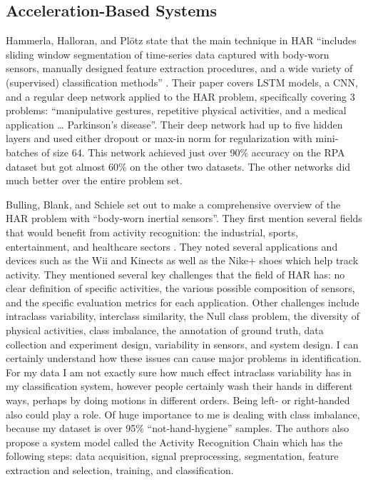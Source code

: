\documentclass[]{report}
\begin{document}
\subsection{Acceleration-Based Systems}

Hammerla, Halloran, and Plötz state that the main technique in HAR “includes sliding window segmentation of time-series data captured with body-worn sensors, manually designed feature extraction procedures, and a wide variety of (supervised) classification methods” \cite{Hammerla}. Their paper covers LSTM models, a CNN, and a regular deep network applied to the HAR problem, specifically covering 3 problems: “manipulative gestures, repetitive physical activities, and a medical application … Parkinson’s disease”. Their deep network had up to five hidden layers and used either dropout or max-in norm for regularization with mini-batches of size 64. This network achieved just over 90\% accuracy on the RPA dataset but got almost 60\% on the other two datasets. The other networks did much better over the entire problem set.

Bulling, Blank, and Schiele set out to make a comprehensive overview of the HAR problem with “body-worn inertial sensors”. They first mention several fields that would benefit from activity recognition: the industrial, sports, entertainment, and healthcare sectors \cite{Bulling}. They noted several applications and devices such as the Wii and Kinects as well as the Nike+ shoes which help track activity. They mentioned several key challenges that the field of HAR has: no clear definition of specific activities, the various possible composition of sensors, and the specific evaluation metrics for each application. Other challenges include intraclass variability, interclass similarity, the Null class problem, the diversity of physical activities, class imbalance, the annotation of ground truth, data collection and experiment design, variability in sensors, and system design. I can certainly understand how these issues can cause major problems in identification. For my data I am not exactly sure how much effect intraclass variability has in my classification system, however people certainly wash their hands in different ways, perhaps by doing motions in different orders. Being left- or right-handed also could play a role. Of huge importance to me is dealing with class imbalance, because my dataset is over 95\% “not-hand-hygiene” samples. The authors also propose a system model called the Activity Recognition Chain which has the following steps: data acquisition, signal preprocessing, segmentation, feature extraction and selection, training, and classification.
\end{document}
